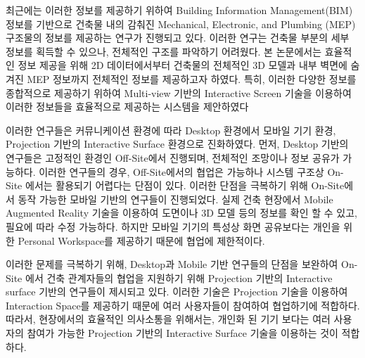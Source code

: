 최근에는 이러한 정보를 제공하기 위하여 Building Information Management(BIM) 정보를 기반으로 건축물 내의 감춰진 Mechanical, Electronic, and Plumbing (MEP) 구조물의 정보를 제공하는 연구가 진행되고 있다\cite{schall_handheld_2009,olbrich_augmented_2013,kwon_defect_2014,webster_augmented_????,golparvar-fard_d4ar4-dimensional_2009}. 이러한 연구는 건축물 부분의 세부 정보를 획득할 수 있으나, 전체적인 구조를 파악하기 어려웠다\cite{webster_augmented_????}. 본 논문에서는 효율적인 정보 제공을 위해 2D 데이터에서부터 건축물의 전체적인 3D 모델과 내부 벽면에 숨겨진 MEP 정보까지 전체적인 정보를 제공하고자 하였다. 특히, 이러한 다양한 정보를 종합적으로 제공하기 위하여 Multi-view 기반의 Interactive Screen 기술을 이용하여 이러한 정보들을 효율적으로 제공하는 시스템을 제안하였다

이러한 연구들은 커뮤니케이션 환경에 따라 Desktop 환경에서 모바일 기기 환경, Projection 기반의 Interactive Surface 환경으로 진화하였다. 먼저, Desktop 기반의 연구\cite{dong_collaborative_2013,golparvar-fard_d4ar4-dimensional_2009,lin_using_2014}들은 고정적인 환경인 Off-Site에서 진행되며, 전체적인 조망이나 정보 공유가 가능하다. 이러한 연구들의 경우, Off-Site에서의 협업은 가능하나 시스템 구조상 On-Site 에서는 활용되기 어렵다는 단점이 있다. 이러한 단점을 극복하기 위해 On-Site에서 동작 가능한 모바일 기반의 연구들\cite{saidi_value_????,kwon_defect_2014,cote_augmented_2013,irizarry_ambient_2014,hammad_distributed_2009,bae_high-precision_2013,ammari_collaborative_2014,williams_bim2mar:_2015}이 진행되었다. 실제 건축 현장에서 Mobile Augmented Reality 기술을 이용하여 도면이나 3D 모델 등의 정보를 확인 할 수 있고, 필요에 따라 수정 가능하다. 하지만 모바일 기기의 특성상 화면 공유보다는 개인을 위한 Personal Workspace를 제공하기 때문에 협업에 제한적이다. 

이러한 문제를 극복하기 위해, Desktop과 Mobile 기반 연구들의 단점을 보완하여 On-Site 에서 건축 관계자들의 협업을 지원하기 위해 Projection 기반의 Interactive surface 기반의 연구들\cite{ishii_augmented_2002,wagner_building_2012,song_penlight:_2009}이 제시되고 있다. 이러한 기술은 Projection 기술을 이용하여 Interaction Space를 제공하기 때문에 여러 사용자들이 참여하여 협업하기에 적합하다. 따라서, 현장에서의 효율적인 의사소통을 위해서는, 개인화 된 기기 보다는 여러 사용자의 참여가 가능한 Projection 기반의 Interactive Surface 기술을 이용하는 것이 적합하다.





